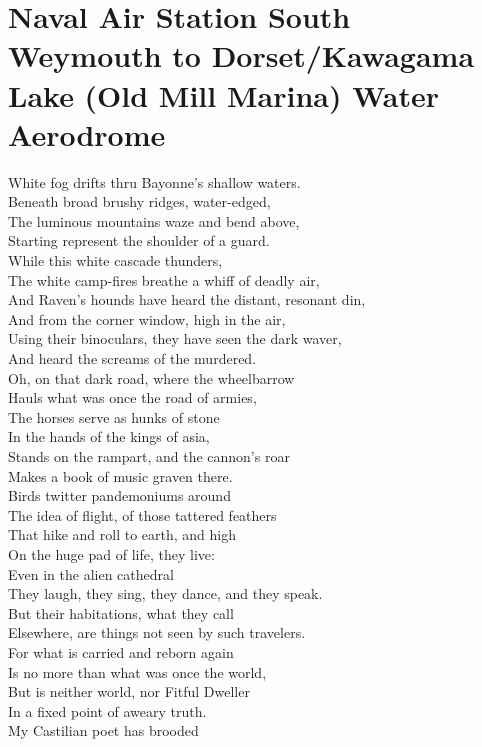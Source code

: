 \documentclass[smalldemyvopaper,11pt,twoside,onecolumn,openright,extrafontsizes]{memoir}
\begin{document}
\chapter{Naval Air Station South Weymouth to Dorset/Kawagama Lake (Old Mill Marina) Water Aerodrome}
White fog drifts thru Bayonne's shallow waters.
\\Beneath broad brushy ridges, water-edged,
\\The luminous mountains waze and bend above,
\\Starting represent the shoulder of a guard.
\\While this white cascade thunders,
\\The white camp-fires breathe a whiff of deadly air,
\\And Raven's hounds have heard the distant, resonant din,
\\And from the corner window, high in the air,
\\Using their binoculars, they have seen the dark waver,
\\And heard the screams of the murdered.
\\Oh, on that dark road, where the wheelbarrow
\\Hauls what was once the road of armies,
\\The horses serve as hunks of stone
\\In the hands of the kings of asia,
\\Stands on the rampart, and the cannon's roar
\\Makes a book of music graven there.
\\Birds twitter pandemoniums around
\\The idea of flight, of those tattered feathers
\\That hike and roll to earth, and high
\\On the huge pad of life, they live:
\\Even in the alien cathedral
\\They laugh, they sing, they dance, and they speak.
\\But their habitations, what they call
\\Elsewhere, are things not seen by such travelers.
\\For what is carried and reborn again
\\Is no more than what was once the world,
\\But is neither world, nor Fitful Dweller
\\In a fixed point of aweary truth.
\\My Castilian poet has brooded
\end{document}
